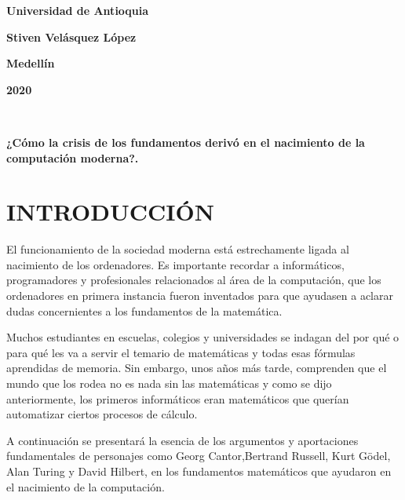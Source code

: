 \documentclass[12pt]{article}
\begin{document}
\begin{center}
\bf{\sc\Huge Universidad de Antioquia}\\
\end{center}
\vspace{120pt}
\begin{center}
\bf{\sc\Huge Stiven Velásquez López }\\
\end{center}
\vspace{200pt}
\begin{center}
\bf{\sc\Huge Medellín}
\end{center}
\begin{center}
\bf{\sc\Huge 2020}\\
\end{center}\
\newpage


\begin{center}

\bf{\sc\Huge ¿Cómo la crisis de los fundamentos derivó en el nacimiento de la computación moderna?. }\\
\end{center}
\begin{flushleft}
\vspace{8PT}
\large
\end{flushleft}

\section{ INTRODUCCIÓN}
\large

El funcionamiento de la sociedad moderna está estrechamente ligada al nacimiento de los ordenadores. Es importante recordar a informáticos, programadores y profesionales relacionados al área de la computación, que los ordenadores en primera instancia fueron inventados para que ayudasen a aclarar dudas concernientes a los fundamentos de la matemática.

\vspace{10PT}
Muchos estudiantes en escuelas, colegios y universidades se indagan del por qué o para qué les va a servir el temario de matemáticas y todas esas fórmulas aprendidas de memoria. Sin embargo, unos años más tarde, comprenden que el mundo que los rodea no es nada sin las matemáticas y como se dijo anteriormente, los primeros informáticos eran matemáticos que querían automatizar ciertos procesos de cálculo.

\vspace{10PT}
A continuación se presentará la esencia de los argumentos y aportaciones fundamentales  de personajes como  Georg Cantor,Bertrand Russell, Kurt Gödel, Alan Turing y David Hilbert, en los fundamentos matemáticos que ayudaron en el nacimiento de la computación.
\end{document}
